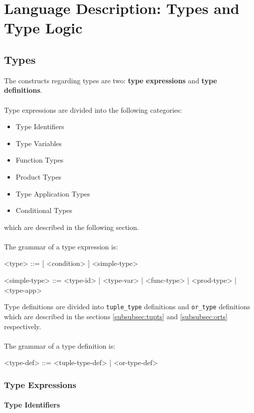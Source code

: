 \documentclass{article}
\begin{document}
\section{Language Description: Types and Type Logic}

\subsection{Types}
\label{subsec:types}

The constructs regarding types are two: \textbf{type expressions} and
\textbf{type definitions}.
\\\\
Type expressions are divided into the following categories:
\begin{itemize}
\item Type Identifiers
\item Type Variables
\item Function Types
\item Product Types
\item Type Application Types
\item Conditional Types
\end{itemize}
which are described in the following section.
\\\\
The grammar of a type expression is:
\begin{grammar}
<type> ::= [ <condition> ]  <simple-type> 

<simple-type> ::= <type-id> | <type-var> | <func-type> | <prod-type> | <type-app>
\\
\end{grammar}
Type definitions are divided into \texttt{tuple_type} definitions and
\texttt{or_type} definitions which are described in the sections
\ref{subsubsec:tupts} and \ref{subsubsec:orts} respectively.
\\\\
The grammar of a type definition is:
\begin{grammar}
<type-def> ::= <tuple-type-def> | <or-type-def>
\end{grammar}

\subsubsection{Type Expressions}

\paragraph{Type Identifiers}
\end{document}
